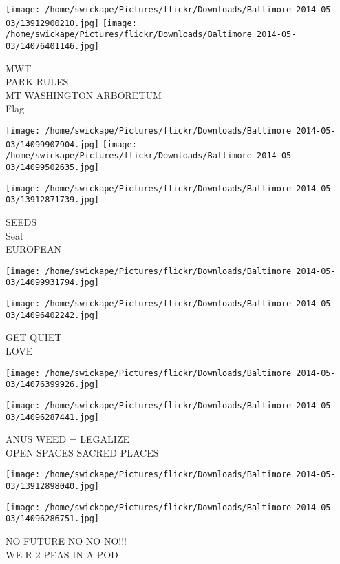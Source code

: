 \documentclass[10pt,letterpaper]{article}
\begin{document}
\texttt{[image: /home/swickape/Pictures/flickr/Downloads/Baltimore 2014-05-03/13912900210.jpg]}
\texttt{[image: /home/swickape/Pictures/flickr/Downloads/Baltimore 2014-05-03/14076401146.jpg]}

MWT\\
PARK RULES\\
MT WASHINGTON ARBORETUM\\
Flag\\
\pagebreak

\texttt{[image: /home/swickape/Pictures/flickr/Downloads/Baltimore 2014-05-03/14099907904.jpg]}
\texttt{[image: /home/swickape/Pictures/flickr/Downloads/Baltimore 2014-05-03/14099502635.jpg]}

\texttt{[image: /home/swickape/Pictures/flickr/Downloads/Baltimore 2014-05-03/13912871739.jpg]}

SEEDS\\
Seat\\
EUROPEAN\\
\pagebreak

\texttt{[image: /home/swickape/Pictures/flickr/Downloads/Baltimore 2014-05-03/14099931794.jpg]}

\vspace{0.25in}
\texttt{[image: /home/swickape/Pictures/flickr/Downloads/Baltimore 2014-05-03/14096402242.jpg]}

GET QUIET\\
LOVE\\
\pagebreak

\texttt{[image: /home/swickape/Pictures/flickr/Downloads/Baltimore 2014-05-03/14076399926.jpg]}

\vspace{0.25in}
\texttt{[image: /home/swickape/Pictures/flickr/Downloads/Baltimore 2014-05-03/14096287441.jpg]}

ANUS WEED = LEGALIZE\\
OPEN SPACES SACRED PLACES\\
\pagebreak

\texttt{[image: /home/swickape/Pictures/flickr/Downloads/Baltimore 2014-05-03/13912898040.jpg]}

\vspace{0.25in}
\texttt{[image: /home/swickape/Pictures/flickr/Downloads/Baltimore 2014-05-03/14096286751.jpg]}

NO FUTURE NO NO NO!!!\\
WE R 2 PEAS IN A POD\\
\pagebreak
\end{document}
